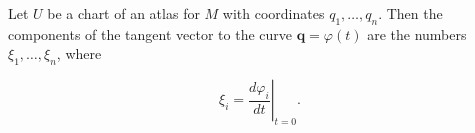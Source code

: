 Let $U$ be a chart of an atlas for $M$ with coordinates $q_1, \ldots, q_n$. Then the components of the tangent vector to the curve $\mathbf{q} = \varphi(t)$ are the numbers $\xi_1, \ldots, \xi_n$, where

$$\xi_i = \left.\frac{d\varphi_i}{dt}\right|_{t=0}.$$
